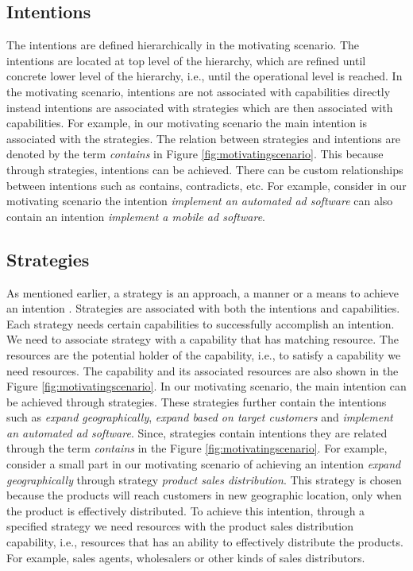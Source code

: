 \subsection{Intentions} 
\label{sec:intentions}
The intentions are defined hierarchically in the motivating scenario. The intentions are located at top level of the hierarchy, which are refined until concrete lower level of the hierarchy, i.e., until the operational level is reached. In the motivating scenario, intentions are not associated with capabilities directly instead intentions are associated with strategies which are then associated with capabilities. For example, in our motivating scenario the main intention is associated with the strategies. The relation between strategies and intentions are denoted by the term \textit{contains} in Figure \ref{fig:motivatingscenario}. This because through strategies, intentions can be achieved. There can be custom relationships between intentions such as contains, contradicts, etc. For example, consider in our motivating scenario the intention \textit{implement an automated ad software} can also contain an intention \textit{implement a mobile ad software}.  

\subsection{Strategies} 
\label{sec:strategies}
As mentioned earlier, a strategy is an approach, a manner or a means to achieve an intention \cite{Bider2005}. Strategies are associated with both the intentions and capabilities. Each strategy needs certain capabilities to successfully accomplish an intention. We need to associate strategy with a capability that has matching resource. The resources are the potential holder of the capability, i.e., to satisfy a capability we need resources. The capability and its associated resources are also shown in the Figure \ref{fig:motivatingscenario}. In our motivating scenario, the main intention can be achieved through strategies. These strategies further contain the intentions such as \textit{expand geographically}, \textit{expand based on target customers} and \textit{implement an automated ad software}. Since, strategies contain intentions they are related through the term \textit{contains} in the Figure \ref{fig:motivatingscenario}. For example, consider a small part in our motivating scenario of achieving an intention \textit{expand geographically} through strategy \textit{product sales distribution}. This strategy is chosen because the products will reach customers in new geographic location, only when the product is effectively distributed. To achieve this intention, through a specified strategy we need resources with the product sales distribution capability, i.e., resources that has an ability to effectively distribute the products. For example, sales agents, wholesalers or other kinds of sales distributors. 

